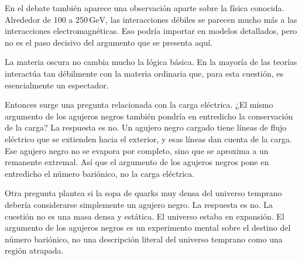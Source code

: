 En el debate también aparece una observación aparte sobre la física conocida. Alrededor de \(100\) a \(250\,\mathrm{GeV}\), las interacciones débiles se parecen mucho más a las interacciones electromagnéticas. Eso podría importar en modelos detallados, pero no es el paso decisivo del argumento que se presenta aquí.

La materia oscura no cambia mucho la lógica básica. En la mayoría de las teorías interactúa tan débilmente con la materia ordinaria que, para esta cuestión, es esencialmente un espectador.

\begin{classroomqa}
\end{classroomqa}

Entonces surge una pregunta relacionada con la carga eléctrica. ¿El mismo argumento de los agujeros negros también pondría en entredicho la conservación de la carga? La respuesta es no. Un agujero negro cargado tiene líneas de flujo eléctrico que se extienden hacia el exterior, y esas líneas dan cuenta de la carga. Ese agujero negro no se evapora por completo, sino que se aproxima a un remanente extremal. Así que el argumento de los agujeros negros pone en entredicho el número bariónico, no la carga eléctrica.

Otra pregunta plantea si la sopa de quarks muy densa del universo temprano debería considerarse simplemente un agujero negro. La respuesta es no. La cuestión no es una masa densa y estática. El universo estaba en expansión. El argumento de los agujeros negros es un experimento mental sobre el destino del número bariónico, no una descripción literal del universo temprano como una región atrapada.

\begin{classroomqa}
\end{classroomqa}

